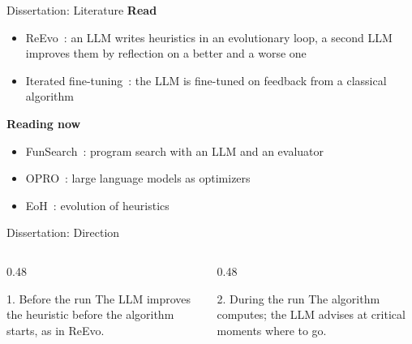\documentclass[aspectratio=43,xcolor={svgnames,table},t]{beamer}
\begin{document}
\begin{frame}{Dissertation: Literature}
  \textbf{Read}
  \begin{itemize}
    \item ReEvo~\cite{Ye2024ReEvo}: an LLM writes heuristics in an evolutionary loop, a second LLM improves them by reflection on a better and a worse one
    \item Iterated fine-tuning~\cite{Awasthi2025IteratedFineTuning}: the LLM is fine-tuned on feedback from a classical algorithm
  \end{itemize}

  \vfill
  \textbf{Reading now}
  \begin{itemize}
    \item FunSearch~\cite{RomeraParedes2024FunSearch}: program search with an LLM and an evaluator
    \item OPRO~\cite{Yang2024OPRO}: large language models as optimizers
    \item EoH~\cite{Liu2024EoH}: evolution of heuristics
  \end{itemize}
  \vfill
\end{frame}

\begin{frame}{Dissertation: Direction}
  \begin{columns}[T]
    \begin{column}{0.48\textwidth}
      \begin{block}{1. Before the run}
        The LLM improves the heuristic before the algorithm starts, as in ReEvo.
      \end{block}
    \end{column}
    \begin{column}{0.48\textwidth}
      \begin{alertblock}{2. During the run}
        The algorithm computes; the LLM advises at critical moments where to go.
      \end{alertblock}
    \end{column}
  \end{columns}

  \vfill
  \centering
  \vfill
\end{frame}
\end{document}
